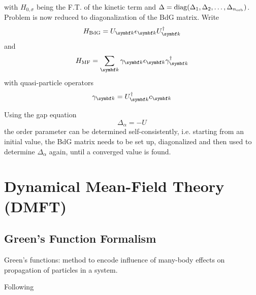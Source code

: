 \documentclass[../notes.tex]{subfiles}
\begin{document}
with \(H_{0, \sigma}\) being the F.T. of the kinetic term and \(\Delta = \operatorname{diag}(\Delta_1, \Delta_2, \ldots, \Delta_{n_{\mathrm{orb}}})\).
Problem is  now reduced to diagonalization of the BdG matrix.
Write
\begin{equation}
	H_{\mathrm{BdG}} = U_{\vb{k}} \epsilon_{\vb{k}} U_{\vb{k}}^{\dagger}
\end{equation}
and 
\begin{equation}
	H_{\mathrm{MF}} = \sum_{\vb{k}} \gamma_{\vb{k}} \epsilon_{\vb{k}} \gamma_{\vb{k}}^{\dagger}
\end{equation}
with quasi-particle operators
\begin{equation}
	\gamma_{\vb{k}} = U_{\vb{k}}^{\dagger} c_{\vb{k}}
\end{equation}


Using the gap equation
\begin{equation}
	\Delta_{\alpha} = -U
\end{equation}
the order parameter can be determined self-consistently, i.e. starting from an initial value, the BdG matrix needs to be set up, diagonalized and then used to determine \(\Delta_{\alpha}\) again, until a converged value is found.


\section{Dynamical Mean-Field Theory (DMFT)}\label{sec:Dynamical Mean-Field Theory}


\subsection{Green's Function Formalism}


Green's functions: method to encode influence of many-body effects on propagation of particles in a system.

Following~\cite{bruusManyBodyQuantumTheory2004}


\end{document}
